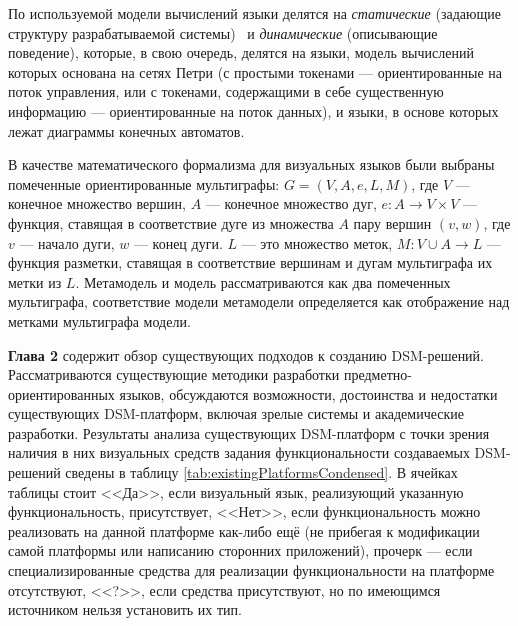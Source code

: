 По используемой модели вычислений языки делятся на \textit{статические} (задающие структуру разрабатываемой системы) \
и \textit{динамические} (описывающие поведение), которые, в свою очередь, делятся на языки, 
модель вычислений которых основана на сетях Петри (с простыми токенами --- ориентированные на поток управления,
или с токенами, содержащими в себе существенную информацию --- ориентированные на поток данных),
и языки, в основе которых лежат диаграммы конечных автоматов.

В качестве математического формализма для визуальных языков были выбраны помеченные
ориентированные мультиграфы: $G = (V, A, e, L, M)$, где $V$ --- конечное множество вершин,
$A$ --- конечное множество дуг, $e: A \rightarrow V \times V$ --- функция, ставящая в соответствие
дуге из множества $A$ пару вершин $(v, w)$, где $v$ --- начало дуги, $w$ --- конец дуги.
$L$ --- это множество меток, $M: V \cup A \rightarrow L$ --- функция разметки, ставящая
в соответствие вершинам и дугам мультиграфа их метки из $L$. Метамодель и модель рассматриваются
как два помеченных мультиграфа, соответствие модели метамодели определяется как отображение
над метками мультиграфа модели.

\textbf{Глава 2} содержит обзор существующих подходов к созданию DSM-решений. 
Рассматриваются существующие методики разработки предметно-ориентированных языков,
обсуждаются возможности, достоинства и недостатки существующих DSM-платформ, 
включая зрелые системы и академические разработки. Результаты анализа существующих 
DSM-платформ с точки зрения наличия в них визуальных средств задания функциональности
создаваемых DSM-решений сведены в таблицу \ref{tab:existingPlatformsCondensed}. В ячейках таблицы
стоит <<Да>>, если визуальный язык, реализующий указанную функциональность, присутствует, <<Нет>>, если
функциональность можно реализовать на данной платформе как-либо ещё (не прибегая к модификации
самой платформы или написанию сторонних приложений), прочерк --- если специализированные 
средства для реализации функциональности на платформе отсутствуют, <<?>>, если средства присутствуют,
но по имеющимся источником нельзя установить их тип.

